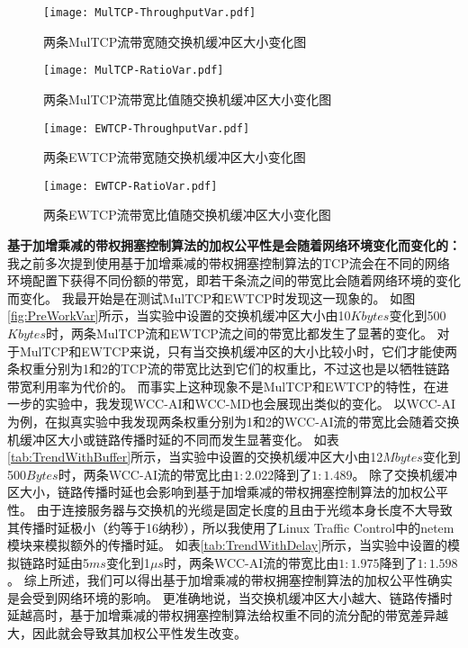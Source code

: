 \documentclass[winfonts]{njuthesis}
\begin{document}
\begin{figure*}[ht]
  \begin{subfigure}{.5\textwidth}
    \centering
		\texttt{[image: MulTCP-ThroughputVar.pdf]}
    \label{fig:MulTCP-ThroughputVar}
    \caption{两条MulTCP流带宽随交换机缓冲区大小变化图}
  \end{subfigure}
	\begin{subfigure}{.5\textwidth}
    \centering
		\texttt{[image: MulTCP-RatioVar.pdf]}
    \label{fig:MulTCP-RatioVar}
    \caption{两条MulTCP流带宽比值随交换机缓冲区大小变化图}
  \end{subfigure}	
	\begin{subfigure}{.5\textwidth}
    \centering
		\texttt{[image: EWTCP-ThroughputVar.pdf]}
    \label{fig:EWTCP-ThroughputVar}
    \caption{两条EWTCP流带宽随交换机缓冲区大小变化图}
  \end{subfigure}
	\begin{subfigure}{.5\textwidth}
    \centering
		\texttt{[image: EWTCP-RatioVar.pdf]}
    \label{fig:EWTCP-RatioVar}
    \caption{两条EWTCP流带宽比值随交换机缓冲区大小变化图}
  \end{subfigure}
	\caption{权重分别为1和2的两条MulTCP和EWTCP流的带宽及其比值随交换机缓冲区大小变化图。}
	\label{fig:PreWorkVar}
\end{figure*}

\textbf{基于加增乘减的带权拥塞控制算法的加权公平性是会随着网络环境变化而变化的：}
我之前多次提到使用基于加增乘减的带权拥塞控制算法的TCP流会在不同的网络环境配置下获得不同份额的带宽，即若干条流之间的带宽比会随着网络环境的变化而变化。
我最开始是在测试MulTCP和EWTCP时发现这一现象的。
如图\ref{fig:PreWorkVar}所示，当实验中设置的交换机缓冲区大小由10$Kbytes$变化到500$Kbytes$时，两条MulTCP流和EWTCP流之间的带宽比都发生了显著的变化。
对于MulTCP和EWTCP来说，只有当交换机缓冲区的大小比较小时，它们才能使两条权重分别为1和2的TCP流的带宽比达到它们的权重比，不过这也是以牺牲链路带宽利用率为代价的。
而事实上这种现象不是MulTCP和EWTCP的特性，在进一步的实验中，我发现WCC-AI和WCC-MD也会展现出类似的变化。
以WCC-AI为例，在拟真实验中我发现两条权重分别为1和2的WCC-AI流的带宽比会随着交换机缓冲区大小或链路传播时延的不同而发生显著变化。
如表\ref{tab:TrendWithBuffer}所示，当实验中设置的交换机缓冲区大小由12$Mbytes$变化到500$Bytes$时，两条WCC-AI流的带宽比由$1:2.022$降到了$1:1.489$。
除了交换机缓冲区大小，链路传播时延也会影响到基于加增乘减的带权拥塞控制算法的加权公平性。
由于连接服务器与交换机的光缆是固定长度的且由于光缆本身长度不大导致其传播时延极小（约等于16纳秒），所以我使用了Linux Traffic Control中的netem模块来模拟额外的传播时延。
如表\ref{tab:TrendWithDelay}所示，当实验中设置的模拟链路时延由5$ms$变化到1$\mu s$时，两条WCC-AI流的带宽比由$1:1.975$降到了$1:1.598$。
综上所述，我们可以得出基于加增乘减的带权拥塞控制算法的加权公平性确实是会受到网络环境的影响。
更准确地说，当交换机缓冲区大小越大、链路传播时延越高时，基于加增乘减的带权拥塞控制算法给权重不同的流分配的带宽差异越大，因此就会导致其加权公平性发生改变。
\end{document}
